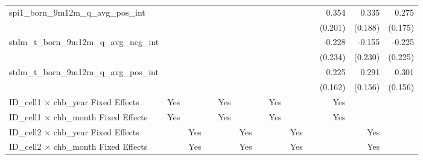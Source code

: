 \begin{tabular}{lrrrrrrrrrrrr}
spi1\_born\_9m12m\_q\_avg\_pos\_int         &              &              &              &              &              &              &              &              &              &        0.354 &        0.335 &        0.275 \\ 
                                            &              &              &              &              &              &              &              &              &              &      (0.201) &      (0.188) &      (0.175) \\ 
stdm\_t\_born\_9m12m\_q\_avg\_neg\_int      &              &              &              &              &              &              &              &              &              &       -0.228 &       -0.155 &       -0.225 \\ 
                                            &              &              &              &              &              &              &              &              &              &      (0.234) &      (0.230) &      (0.225) \\ 
stdm\_t\_born\_9m12m\_q\_avg\_pos\_int      &              &              &              &              &              &              &              &              &              &        0.225 &        0.291 &        0.301 \\ 
                                            &              &              &              &              &              &              &              &              &              &      (0.162) &      (0.156) &      (0.156) \\ 
\midrule
ID\_cell1 $\times$ chb\_year Fixed Effects  &          Yes &              &              &          Yes &              &              &          Yes &              &              &          Yes &              &              \\ 
ID\_cell1 $\times$ chb\_month Fixed Effects &          Yes &              &              &          Yes &              &              &          Yes &              &              &          Yes &              &              \\ 
ID\_cell2 $\times$ chb\_year Fixed Effects  &              &          Yes &              &              &          Yes &              &              &          Yes &              &              &          Yes &              \\ 
ID\_cell2 $\times$ chb\_month Fixed Effects &              &          Yes &              &              &          Yes &              &              &          Yes &              &              &          Yes &              \\ 

\end{tabular}
